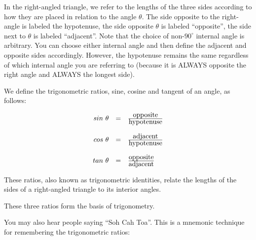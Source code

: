 

In the right-angled triangle, we refer to the lengths of the three sides according to how they are placed in relation to the angle $\theta $. The side opposite to the right-angle is labeled the hypotenuse, the side opposite $\theta $ is labeled ``opposite'', the side next to $\theta $ is labeled ``adjacent''. Note that the choice of non-$90^{\circ}$ internal angle is arbitrary. You can choose either internal angle and then define the adjacent and opposite sides accordingly. However, the hypotenuse remains the same regardless of which internal angle you are referring to (because it is ALWAYS opposite the right angle and ALWAYS the longest side).\par 

We define the trigonometric ratios, sine, cosine and tangent of an angle, as follows:
\par 

\begin{equation*}
\begin{array}{ccc}\hfill sin~\theta & =& \frac{\mbox{opposite}}{\mbox{hypotenuse}}\hfill \\
\\
 \hfill cos~\theta & =& \frac{\mbox{adjacent}}{\mbox{hypotenuse}}\hfill \\
\\
 \hfill tan~\theta & =& \frac{\mbox{opposite}}{\mbox{adjacent}}\hfill 
\end{array}
\end{equation*}

These ratios, also known as trigonometric identities, relate the lengths of the sides of a right-angled triangle to its interior angles.\par 

These three ratios form the basis of trigonometry. \par

You may also hear people saying ``Soh Cah Toa''. This is a mnemonic technique for remembering the trigonometric ratios:\par 

